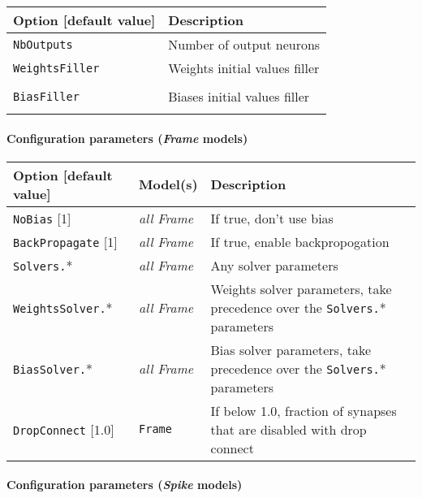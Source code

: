 \documentclass[a4paper,11pt,oneside]{article}
\begin{document}
\begin{center}
 \begin{longtable}{| p{5cm} | p{10cm} | }
 \hline
 Option [default value] & Description\\
 \hline\hline
  \cellcolor{requiredcolor}\lstinline!NbOutputs! & Number of output neurons \\
  \lstinline!WeightsFiller! & Weights initial values filler \\
   & \\
  \lstinline!BiasFiller! & Biases initial values filler \\
   & \\
 \hline
\end{longtable}
\end{center}

\paragraph{Configuration parameters (\emph{Frame} models)}

\begin{center}
 \begin{longtable}{| p{4cm} | p{3cm} | p{9cm} | }
 \hline
 Option [default value] & Model(s) & Description\\
 \hline\hline
  \lstinline!NoBias! [1] & \emph{all Frame} & If true, don't use bias \\
  \lstinline!BackPropagate! [1] & \emph{all Frame} & If true, enable
  backpropogation \\
  \lstinline!Solvers.!* & \emph{all Frame} & Any solver parameters \\
  \lstinline!WeightsSolver.!* & \emph{all Frame} & Weights solver parameters,
  take precedence over the \lstinline!Solvers.!* parameters \\
  \lstinline!BiasSolver.!* & \emph{all Frame} & Bias solver parameters,
  take precedence over the \lstinline!Solvers.!* parameters \\
  \lstinline!DropConnect! [1.0] & \lstinline!Frame! & If below 1.0, fraction of
  synapses that are disabled with drop connect \\
 \hline
\end{longtable}
\end{center}


\paragraph{Configuration parameters (\emph{Spike} models)}
\end{document}
